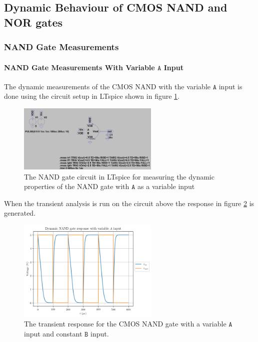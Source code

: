 \documentclass[titlepage, 12pt]{article}
\newcommand\sA{\ensuremath{\mathtt{A}}}
\newcommand\sB{\ensuremath{\mathtt{B}}}
\begin{document}
    \pagebreak
    \subsection{Dynamic Behaviour of CMOS NAND and NOR gates}
    \subsubsection{NAND Gate Measurements}\label{sec:NAND_time}
    \paragraph{NAND Gate Measurements With Variable $\mathtt{A}$
    Input}

    The dynamic measurements of the CMOS NAND with the variable $\sA$ input
    is done using the circuit setup in LTspice shown in figure
    \ref{fig:part_22_NAND_A_circuit}.
    \begin{figure}[H]
        \centering
        \includegraphics[width=0.6\textwidth]
        {figures/part_22_NAND_A_circuit.png}
        \caption{The NAND gate circuit in LTspice for measuring the
            dynamic properties of the NAND gate with $\sA$ as a variable
        input}
        \label{fig:part_22_NAND_A_circuit}
    \end{figure}
    When the transient analysis is run on the circuit above the response
    in figure \ref{fig:part_22_NAND_A} is generated.
    \begin{figure}[H]
        \centering
        \includegraphics[width=0.6\textwidth]{figures/part_22_NAND_A.png}
        \caption{The transient response for the CMOS NAND gate with a
        variable $\sA$ input and constant $\sB$ input.}
        \label{fig:part_22_NAND_A}
    \end{figure}
\end{document}
